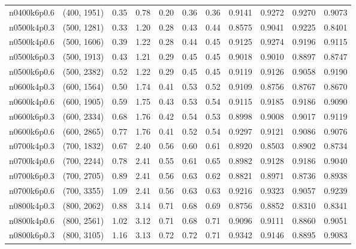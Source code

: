 \begin{tabular}{llrrrrrrrrr}
n0400k6p0.6 &   (400, 1951) &   0.35 &   0.78 &  0.20 &  0.36 &   0.36 &   0.9141 &   0.9272 &     0.9270 &      0.9073 \\
n0500k4p0.3 &   (500, 1281) &   0.33 &   1.20 &  0.28 &  0.43 &   0.44 &   0.8575 &   0.9041 &     0.9225 &      0.8401 \\
n0500k4p0.6 &   (500, 1606) &   0.39 &   1.22 &  0.28 &  0.44 &   0.45 &   0.9125 &   0.9274 &     0.9196 &      0.9115 \\
n0500k6p0.3 &   (500, 1913) &   0.43 &   1.21 &  0.29 &  0.45 &   0.45 &   0.9018 &   0.9010 &     0.8897 &      0.8747 \\
n0500k6p0.6 &   (500, 2382) &   0.52 &   1.22 &  0.29 &  0.45 &   0.45 &   0.9119 &   0.9126 &     0.9058 &      0.9190 \\
n0600k4p0.3 &   (600, 1564) &   0.50 &   1.74 &  0.41 &  0.53 &   0.52 &   0.9109 &   0.8756 &     0.8767 &      0.8670 \\
n0600k4p0.6 &   (600, 1905) &   0.59 &   1.75 &  0.43 &  0.53 &   0.54 &   0.9115 &   0.9185 &     0.9186 &      0.9090 \\
n0600k6p0.3 &   (600, 2334) &   0.68 &   1.76 &  0.42 &  0.54 &   0.53 &   0.8998 &   0.9008 &     0.9017 &      0.9119 \\
n0600k6p0.6 &   (600, 2865) &   0.77 &   1.76 &  0.41 &  0.52 &   0.54 &   0.9297 &   0.9121 &     0.9086 &      0.9076 \\
n0700k4p0.3 &   (700, 1832) &   0.67 &   2.40 &  0.56 &  0.60 &   0.61 &   0.8920 &   0.8503 &     0.8902 &      0.8734 \\
n0700k4p0.6 &   (700, 2244) &   0.78 &   2.41 &  0.55 &  0.61 &   0.65 &   0.8982 &   0.9128 &     0.9186 &      0.9040 \\
n0700k6p0.3 &   (700, 2705) &   0.89 &   2.41 &  0.56 &  0.63 &   0.62 &   0.8821 &   0.8971 &     0.8736 &      0.8938 \\
n0700k6p0.6 &   (700, 3355) &   1.09 &   2.41 &  0.56 &  0.63 &   0.63 &   0.9216 &   0.9323 &     0.9057 &      0.9239 \\
n0800k4p0.3 &   (800, 2062) &   0.88 &   3.14 &  0.71 &  0.68 &   0.69 &   0.8756 &   0.8852 &     0.8310 &      0.8341 \\
n0800k4p0.6 &   (800, 2561) &   1.02 &   3.12 &  0.71 &  0.68 &   0.71 &   0.9096 &   0.9111 &     0.8860 &      0.9051 \\
n0800k6p0.3 &   (800, 3105) &   1.16 &   3.13 &  0.72 &  0.72 &   0.71 &   0.9342 &   0.9146 &     0.8895 &      0.9083 \\

\end{tabular}
